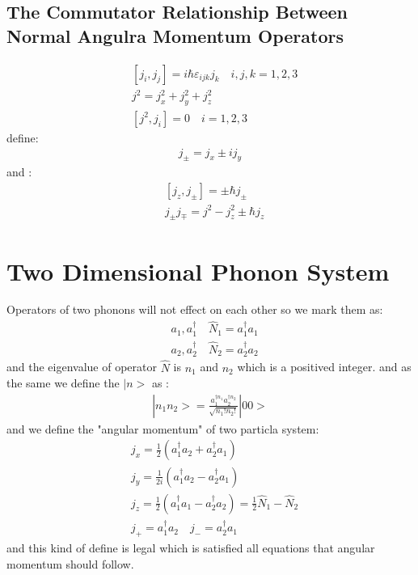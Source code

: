 \documentclass{article}
\begin{document}
\subsection{The Commutator Relationship Between Normal Angulra Momentum Operators}
\begin{align}
  &[j_i,j_j]=i\hbar\varepsilon_{ijk}j_k\quad i,j,k=1,2,3\\
  &j^2=j_x^2+j_y^2+j_z^2 \\
  &[j^2,j_i]=0\quad i=1,2,3 
\end{align}
define:
\begin{align}
  j_{\pm}=j_x\pm ij_y
\end{align}
and :
\begin{align}
  &[j_z,j_{\pm}]=\pm\hbar j_{\pm}\\
  &j_{\pm}j_{\mp}=j^2-j_z^2\pm\hbar j_z
\end{align}

\section{Two Dimensional Phonon System}
Operators of two phonons will not effect on each other so we mark them as:
\begin{align}
&a_1,a^{\dagger}_1\quad \hat N_1=a^{\dagger}_1a_1\\
&a_2,a^{\dagger}_2\quad \hat N_2=a^{\dagger}_2a_2
\end{align}
and the eigenvalue of operator $\hat N$ is $n_1$ and $n_2$ which is a positived integer.
and as the same we define the $|n>$ as :
\begin{align}
  |n_1n_2>=\frac{a^{\dagger n_1}_1a^{\dagger n_2}_2}{\sqrt{n_1!n_2!}}|00>
\end{align}
and we define the "angular momentum" of two particla system:
\begin{align}
&j_x=\frac12(a_1^{\dagger}a_2+a_2^{\dagger}a_1)\\
&j_y=\frac1{2i}(a_1^{\dagger}a_2-a_2^{\dagger}a_1)\\
&j_z=\frac12(a_1^{\dagger}a_1-a_2^{\dagger}a_2)=\frac12{\hat N_1-\hat N_2}\\
& j_{+}=a_1^{\dagger}a_2\quad j_-=a_2^{\dagger}a_1
\end{align}
and this kind of define is legal which is satisfied all equations that angular momentum should follow.
\end{document}
